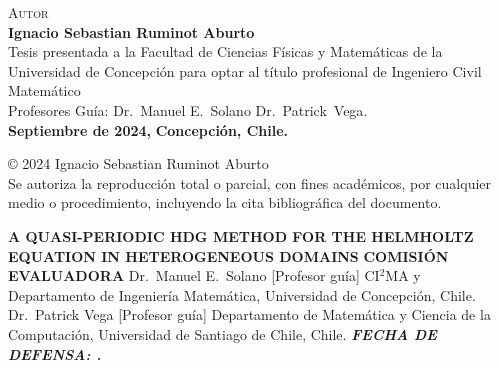 \documentclass[11pt,letterpaper,hidelinks]{book}
\begin{document}
\begin{titlepage}
\vspace{1cm}
\textsc{\large Autor}\\[0.3cm]
\Large{\bf Ignacio Sebastian Ruminot Aburto}\\
\vspace{2cm}
Tesis presentada a la Facultad de Ciencias F\'isicas y Matem\'aticas de la
Universidad de Concepci\'on para optar al t\'itulo profesional de
Ingeniero Civil Matem\'atico\\[0.5cm]
{Profesores Gu\'ia: Dr.~Manuel E.~Solano Dr.~Patrick~Vega.}\\[0.5cm]
{\bf Septiembre de 2024,}
{\bf Concepci\'on, Chile.}
\end{titlepage}

\clearpage
\setcounter{page}{1}
\thispagestyle{plain}
\hspace{1mm}
\vfill
\centering
{\copyright\hspace{1mm} 2024 Ignacio Sebastian Ruminot Aburto}\\[0.6cm]
{Se autoriza la reproducci\'on total o parcial, con fines}
{acad\'emicos, por cualquier medio o procedimiento,}
{incluyendo la cita bibliogr\'afica del documento.}

\clearpage
\thispagestyle{plain}
\center
{\bf \Large A QUASI-PERIODIC HDG METHOD FOR THE HELMHOLTZ EQUATION IN HETEROGENEOUS DOMAINS}
\vspace{1cm}
\justifying
\vspace{2.5cm}
{\bf \large COMISI\'ON EVALUADORA}
\vspace{1cm}
{Dr.~Manuel E.~Solano [Profesor gu\'ia]}
{CI$^2$MA y Departamento de Ingenier\'ia Matem\'atica, Universidad de Concepción, Chile.} 
\vspace{0.05cm}
{Dr.~Patrick Vega [Profesor gu\'ia]}
{Departamento de Matemática y Ciencia de la Computación, Universidad de Santiago de Chile, Chile.}
\vspace{0.2cm}
\vspace{0.2cm}
\vspace{0.2cm}
{\it\bf FECHA DE DEFENSA: .}


\clearpage
\thispagestyle{plain}
\end{document}
